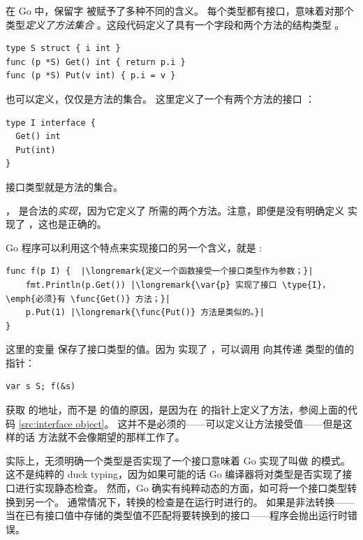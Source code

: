 \noindent{}
在 Go 中，保留字  被赋予了多种不同的含义。
每个类型都有接口，意味着对那个类型\emph{定义了方法集合}
。这段代码定义了具有一个字段和两个方法的结构类型 。
\begin{lstlisting}[caption=定义结构和结构的方法,label=src:interface object]
type S struct { i int }
func (p *S) Get() int { return p.i }
func (p *S) Put(v int) { p.i = v }
\end{lstlisting}
也可以定义，仅仅是方法的集合。
这里定义了一个有两个方法的接口 ：
\begin{lstlisting}
type I interface {
  Get() int
  Put(int)
}
\end{lstlisting}
\begin{lbar}
接口类型就是方法的集合。
\end{lbar}

 ， 是合法的\emph{实现}，因为它定义了 
所需的两个方法。注意，即便是没有明确定义  实现了 ，这也是正确的。

Go 程序可以利用这个特点来实现接口的另一个含义，就是
:

\begin{lstlisting}
func f(p I) {  |\longremark{定义一个函数接受一个接口类型作为参数；}|
    fmt.Println(p.Get()) |\longremark{\var{p} 实现了接口 \type{I}，\emph{必须}有 \func{Get()} 方法；}|
    p.Put(1) |\longremark{\func{Put()} 方法是类似的。}|
}
\end{lstlisting}
\showremarks
这里的变量  保存了接口类型的值。因为
 实现了 ，可以调用  向其传递  类型的值的指针：
\begin{lstlisting}
var s S; f(&s)
\end{lstlisting}

获取  的地址，而不是  的值的原因，是因为在  
的指针上定义了方法，参阅上面的代码 \ref{src:interface object}。
这并不是必须的——可以定义让方法接受值——但是这样的话  方法就不会像期望的那样工作了。

实际上，无须明确一个类型是否实现了一个接口意味着 Go 实现了叫做
\cite{duck_typing} 的模式。
这不是纯粹的 duck typing，因为如果可能的话 Go 编译器将对类型是否实现了接口进行实现静态检查。
然而，Go 确实有纯粹动态的方面，如可将一个接口类型转换到另一个。
通常情况下，转换的检查是在运行时进行的。
如果是非法转换——当在已有接口值中存储的类型值不匹配将要转换到的接口——程序会抛出运行时错误。

